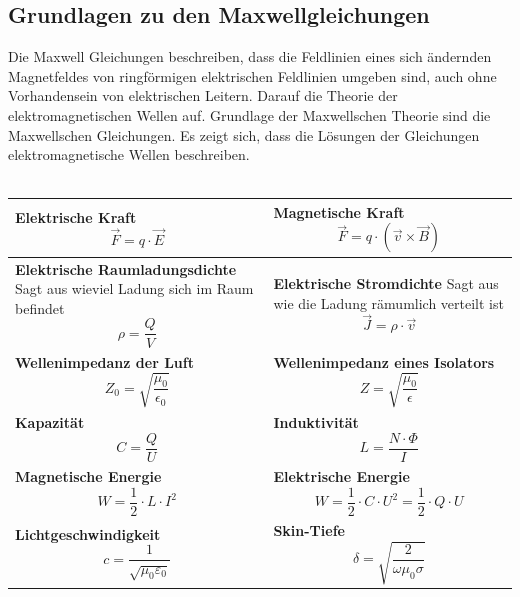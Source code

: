 \subsection{Grundlagen zu den Maxwellgleichungen}
Die Maxwell Gleichungen beschreiben, dass die Feldlinien eines sich ändernden Magnetfeldes von ringförmigen elektrischen Feldlinien umgeben sind, auch ohne Vorhandensein von elektrischen Leitern. Darauf die Theorie der elektromagnetischen Wellen auf. Grundlage der Maxwellschen Theorie sind die Maxwellschen Gleichungen. Es zeigt sich, dass die Lösungen der Gleichungen elektromagnetische Wellen beschreiben.\\
\vspace{0.2cm}\\
\renewcommand{\arraystretch}{1.2}
\begin{tabular}{|p{} |p{}|}
	\hline
	\textbf{Elektrische Kraft}\newline
	\[\vec{F}=q\cdot \vec{E}\]&
	\textbf{Magnetische Kraft}\newline
	\[\vec{F}=q\cdot(\vec{v}\times \vec{B})\]\\
	\hline
	\textbf{Elektrische Raumladungsdichte}\newline
	Sagt aus wieviel Ladung sich im Raum befindet\newline
	\[ \rho  = \frac{Q}{V}\]&
	\textbf{Elektrische Stromdichte}\newline
	Sagt aus wie die Ladung rämumlich verteilt ist\newline
	\[\vec{J}=\rho \cdot \vec{v}\]\\
	\hline
	\textbf{Wellenimpedanz der Luft}\newline
	\[Z_{0}=\sqrt{\frac{\mu_{0}}{\epsilon_{0}}} \]&
	\textbf{Wellenimpedanz eines Isolators}\newline
	\[Z=\sqrt{\frac{\mu_{0}}{\epsilon}} \]\\
	\hline
	\textbf{Kapazität}\newline
	\[C=\frac{Q}{U} \] &
	\textbf{Induktivität}\newline
	\[L=\frac{N\cdot \Phi }{I} \]\\
	\hline
	\textbf{Magnetische Energie}\newline
	\[W= \frac{1}{2}\cdot L \cdot I^{2}\]&
	\textbf{Elektrische Energie}\newline
	\[W= \frac{1}{2}\cdot C \cdot U^{2}=\frac{1}{2}\cdot Q\cdot U \]\\
	\hline
	\textbf{Lichtgeschwindigkeit} \newline
	\[ c = \dfrac{1}{\sqrt{\mu_0\varepsilon_0}}\] & 
	\textbf{Skin-Tiefe}\newline 
	\[ \delta = \sqrt{\dfrac{2}{\omega\mu_0\sigma}}\] \\
	\hline
\end{tabular}
